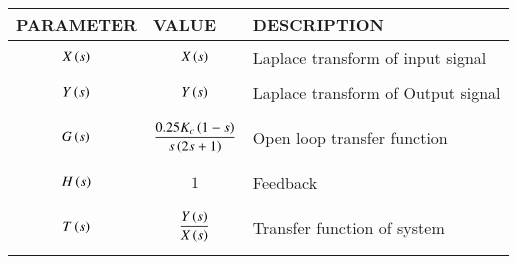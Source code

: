 \begin{tabular}{|p{2cm}|p{2cm}|p{4cm}|}
    \hline
    PARAMETER & VALUE & DESCRIPTION   \\ \hline
    $$X\left(s\right)$$ & $$X\left(s\right)$$ & Laplace transform of input signal  \\ \hline
    $$Y\left(s\right)$$ & $$Y\left(s\right)$$ & Laplace transform of Output signal  \\ \hline
    $$G\left(s\right)$$ & $$\frac{0.25K_c\left(1-s\right)}{s\left(2s+1\right)}$$ & Open loop transfer function    \\ \hline
    $$H\left(s\right)$$ & $$1$$ & Feedback  \\ \hline
    $$T\left(s\right)$$ & $$\frac{Y\left(s\right)}{X\left(s\right)}$$ & Transfer function of system   \\ \hline
    \end{tabular}
